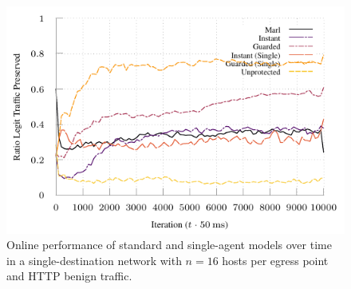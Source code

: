 \documentclass[10pt, times, conference, letterpaper]{IEEEtran}
\begin{document}
\begin{figure}
	\centering
	\includegraphics[width=0.8\linewidth]{../plots/tnsm-tcp-16-single}
	\vspace{-1em}
	\caption{
		Online performance of standard and single-agent models over time in a single-destination network with $n=16$ hosts per egress point and HTTP benign traffic.
		\vspace{-1em}
		\label{fig:tcp-tree-16}
	}
\end{figure}

%	

%	

%	
\end{document}
